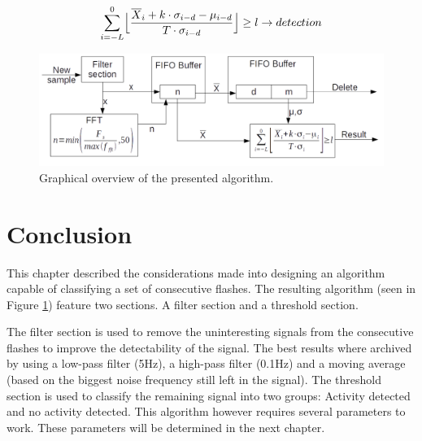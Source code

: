 \begin{equation}
\label{Zscore_improved}
\sum_{i = -L}^{0} \Bigl\lfloor{\frac{\overline{X}_i + k\cdot\sigma_{i-d} - \mu_{i-d}}{T \cdot \sigma_{i-d}}} \Bigr\rfloor \geq l \rightarrow detection 
\end{equation}

\begin{figure}
	\centering     %
	\includegraphics[width=120mm]{pics/ThresholdAlgorithmOverview_double_FIFO.png}
	\caption{Graphical overview of the presented algorithm.\label{fig:fullAlgorithm}}
\end{figure}

\section{Conclusion}

This chapter described the considerations made into designing an algorithm capable of classifying a set of consecutive flashes. The resulting algorithm (seen in Figure \ref{fig:fullAlgorithm}) feature two sections. A filter section and a threshold section. 

The filter section is used to remove the uninteresting signals from the consecutive flashes to improve the detectability of the signal. The best results where archived by using a low-pass filter (5Hz), a high-pass filter (0.1Hz) and a moving average (based on the biggest noise frequency still left in the signal). The threshold section is used to classify the remaining signal into two groups: Activity detected and no activity detected. This algorithm however requires several parameters to work. These parameters will be determined in the next chapter.